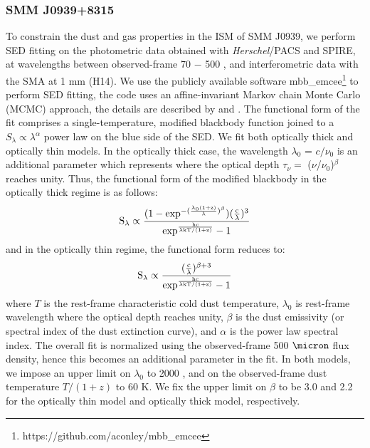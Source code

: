 \documentclass[twocolumn,apj,numberedappendix]{emulateapj}
\begin{document}
\subsubsection{SMM J0939+8315} 
To constrain the dust and gas properties in the ISM of SMM J0939, we perform SED fitting on the
photometric data obtained with {\it Herschel}/PACS and SPIRE, at wavelengths
between observed-frame 70 \micron $-$ 500 \micron, and interferometric data with the SMA at 1 mm (H14). We use the publicly
available software {\sc mbb\_emcee}\footnote{https://github.com/aconley/mbb\_emcee} to perform SED fitting, the code uses an affine-invariant Markov chain Monte
Carlo (MCMC) approach, the details are described by \citet{Riechers13a} and \citet{Dowell14a}. The
functional form of the fit comprises a single-temperature, modified blackbody function joined to a $S_{\lambda} \propto \lambda^\alpha
$ power law on the blue
side of the SED.
We fit both optically thick and optically thin models. In the optically thick case, the wavelength $
\lambda_0$ = ${c}/{\nu_0}$ is an additional parameter which represents where the optical
depth $\tau_{\nu} =$ ($\nu$/$\nu_0$)$^\beta$ reaches unity. Thus, the functional form of the modified blackbody
in the optically thick regime is as follows:
\begin{equation}
\rm S_{\lambda} \propto \frac{(1-exp^{-(\frac{\lambda_0 (1+z)}{\lambda})^{\beta}})(\frac{c}{\lambda})^3}
{exp^{\frac{hc}{\lambda\rm{kT/(1+z)} } }-1}
\end{equation}
and in the optically thin regime, the functional form reduces to:
\begin{equation}
\rm S_{\lambda} \propto \frac{(\frac{c}{\lambda})^{\beta+3}}{exp^{\frac{hc}{\lambda\rm{kT/(1+z)}}}-1}
\end{equation}
where $T$ is the rest-frame characteristic cold dust temperature, $\lambda_0$ is rest-frame wavelength
where the optical depth reaches unity, $\beta$ is the dust emissivity (or spectral index of the dust extinction
curve), and $\alpha$ is the power law spectral index. The overall fit is normalized using the observed-frame 500
$\micron$ flux density, hence this becomes an additional parameter in the fit. In both models, we impose an upper limit on $
\lambda_0$ to 2000 \micron, and on the observed-frame dust temperature $T/(1+z)$ to 60 K. We fix the upper limit on 
$\beta$ to be 3.0 and 2.2 for the optically thin model and optically thick model, respectively.
\end{document}
